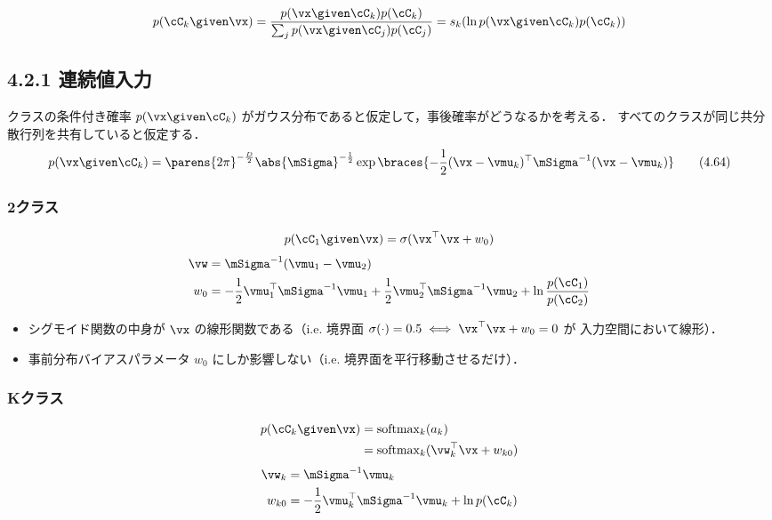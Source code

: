 \begin{equation}
  p(\cC_k \given \vx) = \frac{\likpri{k}}{\sum_j \likpri{j}} = s_k(\ln \likpri{k})
\end{equation}


\subsection*{4.2.1 連続値入力}

クラスの条件付き確率 $p(\vx \given \cC_k)$ がガウス分布であると仮定して，事後確率がどうなるかを考える．
すべてのクラスが同じ共分散行列を共有していると仮定する．
\[
p(\vx \given \cC_k) = \parens{2\pi}^{-\frac{D}{2}} \abs{\mSigma}^{-\frac{1}{2}} \exp \braces{-\frac{1}{2} (\vx - \vmu_k)^\top \mSigma^{-1} (\vx - \vmu_k) } \tag{4.64}
\]

\subsubsection*{2クラス}

\begin{equation}
  p(\cC_1 \given \vx) = \sigma(\vx^\top \vx + w_0)
\end{equation}
\begin{align}
  \vw & = \mSigma^{-1} (\vmu_1 - \vmu_2) \\
  w_0 & = -\frac{1}{2} \vmu_1^\top \mSigma^{-1} \vmu_1 + \frac{1}{2} \vmu_2^\top \mSigma^{-1} \vmu_2 + \ln \frac{p(\cC_1)}{p(\cC_2)}
\end{align}

\begin{itemize}
  \item シグモイド関数の中身が $\vx$ の線形関数である（i.e. 境界面 $\sigma(\cdot) = 0.5 \iff \vx^\top \vx + w_0 = 0$ が 入力空間において線形）．
  \item 事前分布バイアスパラメータ $w_0$ にしか影響しない（i.e. 境界面を平行移動させるだけ）．
\end{itemize}

\subsubsection*{Kクラス}

\begin{align}
  p(\cC_k \given \vx) & = \mathrm{softmax}_k(a_k) \notag \\
  & =  \mathrm{softmax}_k( \vw_k^\top \vx + w_{k0} )
\end{align}
\begin{align}
  \vw_k & = \mSigma^{-1} \vmu_k \\
  w_{k0} & = -\frac{1}{2} \vmu_k^\top \mSigma^{-1} \vmu_k + \ln p(\cC_k)
\end{align}

